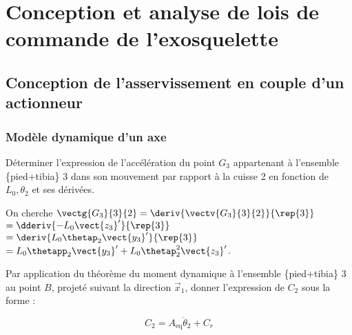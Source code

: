 \documentclass[11pt]{article}
\begin{document}
\section{Conception et analyse de lois de commande de l’exosquelette}
\subsection{Conception de l'asservissement en couple d'un actionneur}

\subsubsection{Modèle dynamique d'un axe}

\UPSTIquestion Déterminer l'expression de l'accélération du point $G_{3}$ appartenant à l'ensemble \{pied+tibia\} 3 dans son mouvement par rapport à la cuisse 2 en fonction de $L_{0}, \theta_{2}$ et ses dérivées.

\begin{UPSTIcorrige}
On cherche $\vectg{G_3}{3}{2} = \deriv{\vectv{G_3}{3}{2}}{\rep{3}}$ $= \dderiv{-L_0 \vect{z_3}'}{\rep{3}}$
$= \deriv{L_0 \thetap_2 \vect{y_3}'}{\rep{3}}$
$= L_0 \thetapp_2 \vect{y_3}' +L_0 \thetap_2^2 \vect{z_3}' $.

\end{UPSTIcorrige}

\UPSTIquestion Par application du théorème du moment dynamique à l'ensemble \{pied+tibia\} 3 au point $B$, projeté suivant la direction $\vec{x}_{1}$, donner l'expression de $C_{2}$ sous la forme :

$$
C_{2}=A_{\mathrm{eq}} \ddot{\theta}_{2}+C_{r}
$$
\end{document}
